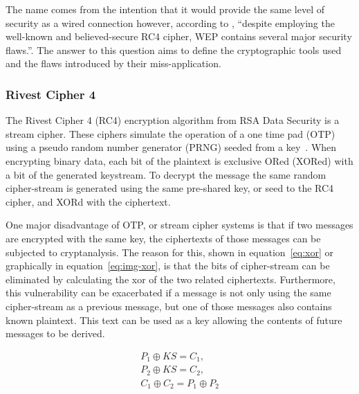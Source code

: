 \documentclass[pdftex, 11pt, a4paper]{article}
\begin{document}
The name comes from the intention that it would provide the same level of security as a wired connection however, according to \textcite{intercepting-wifi}, ``despite employing the well-known and believed-secure RC4 cipher, WEP contains several major security flaws.''.  The answer to this question aims to define the cryptographic tools used and the flaws introduced by their miss-application.

\subsubsection{Rivest Cipher 4}
The Rivest Cipher 4 (RC4) encryption algorithm from RSA Data Security is a stream cipher. These ciphers simulate the operation of a one time pad (OTP) using a pseudo random number generator (PRNG) seeded from a key~\cite{otp-faq}. When encrypting binary data, each bit of the plaintext is exclusive ORed (XORed) with a bit of the generated keystream. To decrypt the message the same random cipher-stream is generated using the same pre-shared key, or seed to the RC4 cipher, and XORd with the ciphertext.

One major disadvantage of OTP, or stream cipher systems is that if two messages are encrypted with the same key, the ciphertexts of those messages can be subjected to cryptanalysis.  The reason for this, shown in equation~\ref{eq:xor} or graphically in equation~\ref{eq:img-xor}, is that the bits of cipher-stream can be eliminated by calculating the xor of the two related ciphertexts. Furthermore, this vulnerability can be exacerbated if a message is not only using the same cipher-stream as a previous message, but one of those messages also contains known plaintext.  This text can be used as a key allowing the contents of future messages to be derived.

\begin{subequations}
    \begin{align}
       P_1 \oplus KS = C_1,\\
       P_2 \oplus KS = C_2,\\
       C_1 \oplus C_2 = P_1 \oplus P_2\label{eq:xor}
    \end{align}
\end{subequations}
\end{document}
